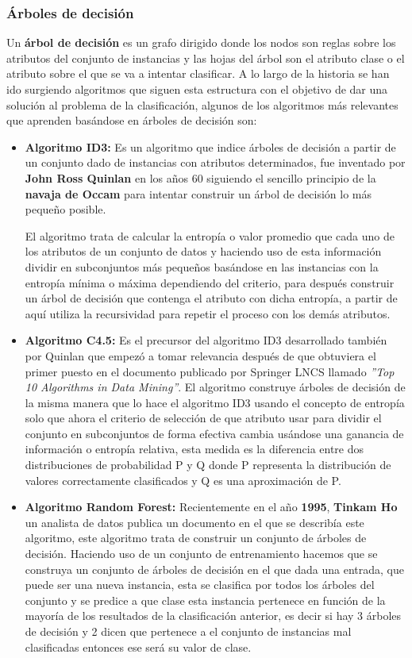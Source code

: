\documentclass[a4paper, 11pt]{article} %
\begin{document}
\subsubsection{Árboles de decisión}
Un \textbf{árbol de decisión} es un grafo dirigido donde los nodos son reglas sobre los atributos del conjunto de instancias y las hojas del árbol son el atributo clase o el atributo sobre el que se va a intentar clasificar. A lo largo de la historia se han ido surgiendo algoritmos que siguen esta estructura con el objetivo de dar una solución al problema de la clasificación, algunos de los algoritmos más relevantes que aprenden basándose en árboles de decisión son:
\begin{itemize}
\item \textbf{Algoritmo ID3:} Es un algoritmo que indice árboles de decisión a partir de un conjunto dado de instancias con atributos determinados, fue inventado por \textbf{John Ross Quinlan} en los años 60 siguiendo el sencillo principio de la \textbf{navaja de Occam} para intentar construir un árbol de decisión lo más pequeño posible.

El algoritmo trata de calcular la entropía o valor promedio que cada uno de los atributos de un conjunto de datos y haciendo uso de esta información dividir en subconjuntos más pequeños basándose en las instancias con la entropía mínima o máxima dependiendo del criterio, para después construir un árbol de decisión que contenga el atributo con dicha entropía, a partir de aquí utiliza la recursividad para repetir el proceso con los demás atributos.
\item \textbf{Algoritmo C4.5:} Es el precursor del algoritmo ID3 desarrollado también por Quinlan que empezó a tomar relevancia después de que obtuviera el primer puesto  en el documento publicado por Springer LNCS llamado \textit{''Top 10 Algorithms in Data Mining''}.
El algoritmo construye árboles de decisión de la misma manera que lo hace el algoritmo ID3 usando el concepto de entropía solo que ahora el criterio de selección de que atributo usar para dividir el conjunto en subconjuntos de forma efectiva cambia usándose una ganancia de información o entropía relativa, esta medida es la diferencia entre dos distribuciones de probabilidad P y Q donde P representa la distribución de valores correctamente clasificados y Q  es una aproximación de P.
\item \textbf{Algoritmo Random Forest:} Recientemente en el año \textbf{1995}, \textbf{Tinkam Ho} un analista de datos publica un documento en el que se describía este algoritmo, este algoritmo trata de construir un conjunto de árboles de decisión. Haciendo uso de un conjunto de entrenamiento hacemos que se construya un conjunto de árboles de decisión en el que dada una entrada, que puede ser una nueva instancia, esta se clasifica por todos los árboles del conjunto y se predice a que clase esta instancia pertenece en función de la mayoría de los resultados de la clasificación anterior, es decir si hay 3 árboles de decisión y 2 dicen que pertenece a el conjunto de instancias mal clasificadas entonces ese será su valor de clase.
\end{itemize}
\end{document}
